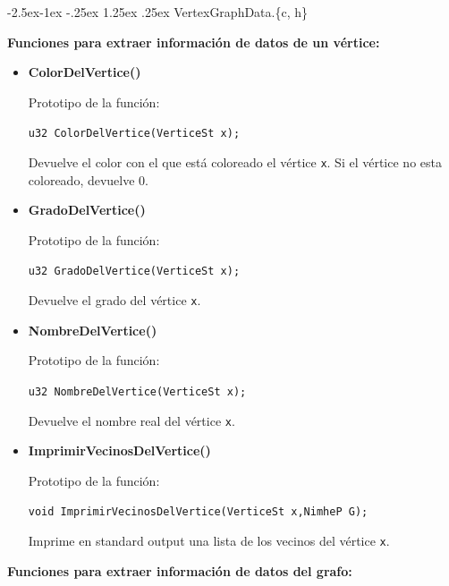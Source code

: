 \documentclass[11pt,a4paper]{article}
\makeatletter
\renewcommand\paragraph{\@startsection{paragraph}{4}{\z@}%
            {-2.5ex\@plus -1ex \@minus -.25ex}%
            {1.25ex \@plus .25ex}%
            {\normalfont\normalsize\bfseries}}
\theoremstyle{plain}
\makeatother
\begin{document}
				\paragraph{VertexGraphData.\{c, h\}}

\textbf{Funciones para extraer información de datos de un vértice:}

\begin{itemize}

\item{\textbf{{ColorDelVertice()}}}

Prototipo de la función:

\texttt{u32 ColorDelVertice(VerticeSt x);}

Devuelve el color con el que está coloreado el vértice \texttt{x}. Si el vértice no esta coloreado, devuelve 0.

\item{\textbf{{GradoDelVertice()}}}

Prototipo de la función:

\texttt{u32 GradoDelVertice(VerticeSt x);}

Devuelve el grado del vértice \texttt{x}.

\item{\textbf{{NombreDelVertice()}}}

Prototipo de la función:

\texttt{u32 NombreDelVertice(VerticeSt x);}

Devuelve el nombre real del vértice \texttt{x}.


\item{\textbf{{ImprimirVecinosDelVertice()}}}

Prototipo de la función:

\texttt{void ImprimirVecinosDelVertice(VerticeSt x,NimheP G);}

Imprime en standard output una lista de los vecinos del vértice \texttt{x}.
\end{itemize}

\textbf{Funciones para extraer información de datos del grafo:}
\end{document}
